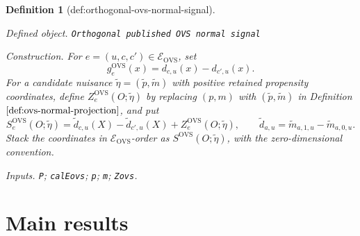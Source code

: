 \documentclass{article}
\newtheorem{definition}{Definition}
\begin{document}
\begin{definition}[def:orthogonal-ovs-normal-signal]\label{def:orthogonal-ovs-normal-signal}
\par\smallskip\noindent\emph{Defined object.} \texttt{Orthogonal published OVS normal signal}
\par\smallskip\noindent\emph{Construction.} For \(e=(u,c,c')\in\mathcal E_{\mathrm{OVS}}\), set
\[
g_e^{\mathrm{OVS}}(x)=d_{c,u}(x)-d_{c',u}(x).
\]
For a candidate nuisance \(\widetilde\eta=(\widetilde p,\widetilde m)\) with positive retained propensity coordinates, define \(Z_e^{\mathrm{OVS}}(O;\widetilde\eta)\) by replacing \((p,m)\) with \((\widetilde p,\widetilde m)\) in Definition \(\ref{def:ovs-normal-projection}\), and put
\[
S_e^{\mathrm{OVS}}(O;\widetilde\eta)
=\widetilde d_{c,u}(X)-\widetilde d_{c',u}(X)
+Z_e^{\mathrm{OVS}}(O;\widetilde\eta),
\qquad
\widetilde d_{a,u}=\widetilde m_{a,1,u}-\widetilde m_{a,0,u}.
\]
Stack the coordinates in \(\mathcal E_{\mathrm{OVS}}\)-order as \(S^{\mathrm{OVS}}(O;\widetilde\eta)\), with the zero-dimensional convention.
\par\smallskip\noindent\emph{Inputs.} \texttt{P}; \texttt{calEovs}; \texttt{p}; \texttt{m}; \texttt{Zovs}.
\end{definition}

\section{Main results}
\end{document}
